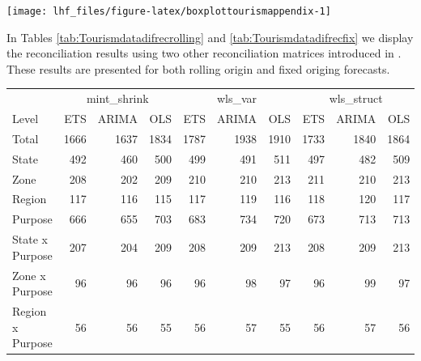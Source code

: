 \documentclass[11pt,a4paper,]{article}
\let\origfigure\figure
\let\endorigfigure\endfigure
\renewenvironment{figure}[1][2] {
    \expandafter\origfigure\expandafter[!htbp]
} {
    \endorigfigure
}
\let\origtable\table
\let\endorigtable\endtable
\renewenvironment{table}[1][2] {
    \expandafter\origtable\expandafter[!htbp]
} {
    \endorigtable
}
\begin{document}
\begin{figure}

{\centering \texttt{[image: lhf\_files/figure-latex/boxplottourismappendix-1]} 

}

\caption{Box plots of scaled forecast errors from reconciled and unreconciled ETS, ARIMA and OLS methods at each hierarchical level for fixed origin tourism demand.}\label{fig:boxplottourismappendix}
\end{figure}

In Tables \ref{tab:Tourismdatadifrecrolling} and \ref{tab:Tourismdatadifrecfix} we display the reconciliation results using two other reconciliation matrices introduced in \autocite{mint2018}. These results are presented for both rolling origin and fixed origing forecasts.

\begin{table}

\caption{\label{tab:Tourismdatadifrecrolling}Mean(RMSE) on 2 year test set for ETS, ARIMA and OLS with different reconciliation matrix - Rolling origin - Tourism dataset.}
\centering
\begin{tabular}[t]{lrrrrrrrrr}
\toprule
\multicolumn{1}{c}{} & \multicolumn{3}{c}{mint\_shrink} & \multicolumn{3}{c}{wls\_var} & \multicolumn{3}{c}{wls\_struct} \\
\cmidrule(l{3pt}r{3pt}){2-4} \cmidrule(l{3pt}r{3pt}){5-7} \cmidrule(l{3pt}r{3pt}){8-10}
Level & ETS & ARIMA & OLS & ETS & ARIMA & OLS & ETS & ARIMA & OLS\\
\midrule
Total & 1666 & 1637 & 1834 & 1787 & 1938 & 1910 & 1733 & 1840 & 1864\\
State & 492 & 460 & 500 & 499 & 491 & 511 & 497 & 482 & 509\\
Zone & 208 & 202 & 209 & 210 & 210 & 213 & 211 & 210 & 213\\
Region & 117 & 116 & 115 & 117 & 119 & 116 & 118 & 120 & 117\\
Purpose & 666 & 655 & 703 & 683 & 734 & 720 & 673 & 713 & 713\\
State x Purpose & 207 & 204 & 209 & 208 & 209 & 213 & 208 & 209 & 213\\
Zone x Purpose & 96 & 96 & 96 & 96 & 98 & 97 & 96 & 99 & 97\\
Region x Purpose & 56 & 56 & 55 & 56 & 57 & 55 & 56 & 57 & 56\\
\bottomrule
\end{tabular}
\end{table}
\end{document}
